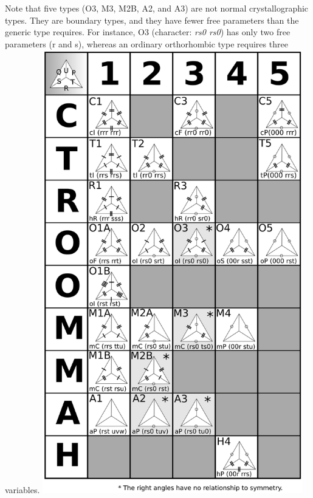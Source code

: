 \documentclass[preprint]{iucr}              %
\numberwithin{equation}{section}
\begin{document}
\begin{table}
{			Note that five types (O3, M3, M2B, A2, and A3) are not normal 
			crystallographic types. They are boundary types, and they have
			fewer free parameters than the generic type requires. For instance,
			O3 (character: \textit{rs0 rs0}) has only two free parameters (r and s), whereas
			an ordinary orthorhombic type requires three variables.}
		\includegraphics[width=0.85\textwidth]{DeloneTypesGrid_3}\\
		\label{s6table}		
	\end{table}
\end{document}
